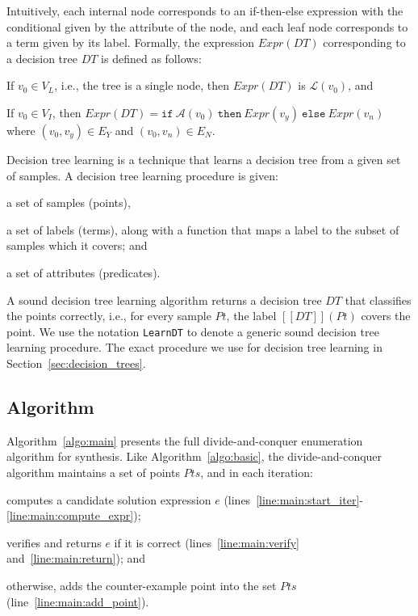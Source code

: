 \documentclass{llncs}
\newcommand\Points{\mathit{Pts}}
\newcommand\Point{\mathit{Pt}}
\newcommand\Expr{e}
\newcommand\sem[1]{[\![ #1 ]\!]}
\newcommand\ITE[3]{\mathtt{if}~#1~\mathtt{then}~#2~\mathtt{else}~#3}
\newcommand\DecisionTree{\mathit{DT}}
\newcommand\DTtoExpr[1]{\mathit{Expr}(#1)}
\newcommand\NodesInternal{V_I}
\newcommand\node{v}
\newcommand\NodesLeaf{V_L}
\newcommand\EdgesYes{E_Y}
\newcommand\EdgesNo{E_N}
\newcommand\Attribute{\mathcal{A}}
\newcommand\Label{\mathcal{L}}
\begin{document}
Intuitively, each internal node corresponds to an if-then-else
expression with the conditional given by the attribute of the node, and
each leaf node corresponds to a term given by its label.
Formally, the expression $\DTtoExpr{\DecisionTree}$ corresponding to a
decision tree $\DecisionTree$ is defined as follows:
\begin{inparaenum}[(a)]
\item If $\node_0 \in \NodesLeaf$, i.e., the tree is a single node, then
    $\DTtoExpr{\DecisionTree}$ is $\Label(\node_0)$, and
\item If $\node_0 \in \NodesInternal$, then $\DTtoExpr{\DecisionTree} =
  \ITE{\Attribute(\node_0)}{\DTtoExpr{\node_y}}{\DTtoExpr{\node_n}}$
  where $(\node_0, \node_y) \in \EdgesYes$ and $(\node_0, \node_n) \in \EdgesNo$.
\end{inparaenum}

Decision tree learning is a technique that learns a decision tree from a
given set of samples.
A decision tree learning procedure is given:
\begin{inparaenum}[(a)]
\item a set of samples (points),
\item a set of labels (terms), along with a function that maps a label to the
  subset of samples which it covers; and
\item a set of attributes (predicates).
\end{inparaenum}
A sound decision tree learning algorithm returns a decision tree
$\DecisionTree$ that classifies the points correctly, i.e., for every
sample $\Point$, the label $\sem{\DecisionTree}(\Point)$ covers the
point.
We use the notation {\tt LearnDT} to denote a generic sound
decision tree learning procedure.
The exact procedure we use for decision tree learning in
Section~\ref{sec:decision_trees}.

\subsection{Algorithm}
\label{sec:algo:main}

Algorithm~\ref{algo:main} presents the full divide-and-conquer
enumeration algorithm for synthesis.
Like Algorithm~\ref{algo:basic}, the divide-and-conquer algorithm
maintains a set of points $\Points$, and in each iteration:
\begin{inparaenum}[(a)]
\item computes a candidate solution expression $\Expr$
  (lines~\ref{line:main:start_iter}-\ref{line:main:compute_expr});
\item verifies and returns $\Expr$ if it is correct (lines~\ref{line:main:verify}
  and~\ref{line:main:return}); and
\item otherwise, adds the counter-example point into the set $\Points$
  (line~\ref{line:main:add_point}).
\end{inparaenum}
\end{document}
